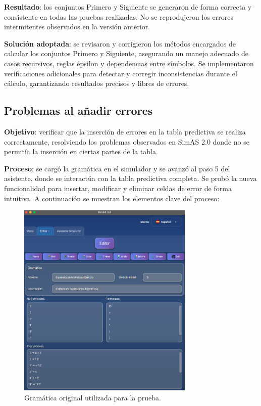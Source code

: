 \textbf{Resultado}: los conjuntos Primero y Siguiente se generaron de forma correcta y consistente en todas las pruebas realizadas. No se reprodujeron los errores intermitentes observados en la versión anterior.
\medskip

\textbf{Solución adoptada}: se revisaron y corrigieron los métodos encargados de calcular los conjuntos Primero y Siguiente, asegurando un manejo adecuado de casos recursivos, reglas épsilon y dependencias entre símbolos. Se implementaron verificaciones adicionales para detectar y corregir inconsistencias durante el cálculo, garantizando resultados precisos y libres de errores.

\subsection{Problemas al añadir errores}

\textbf{Objetivo}: verificar que la inserción de errores en la tabla predictiva se realiza correctamente, resolviendo los problemas observados en SimAS 2.0 donde no se permitía la inserción en ciertas partes de la tabla.
\medskip

\textbf{Proceso}: se cargó la gramática en el simulador y se avanzó al paso 5 del asistente, donde se interactúa con la tabla predictiva completa. Se probó la nueva funcionalidad para insertar, modificar y eliminar celdas de error de forma intuitiva. A continuación se muestran los elementos clave del proceso:
\medskip

\needspace{6cm}
\begin{figure}[H]
  \centering
  \includegraphics[width=0.75\textwidth]{figuras2/pruebas/simulador/gramatica.png}
  \caption{Gramática original utilizada para la prueba.}
\end{figure}

